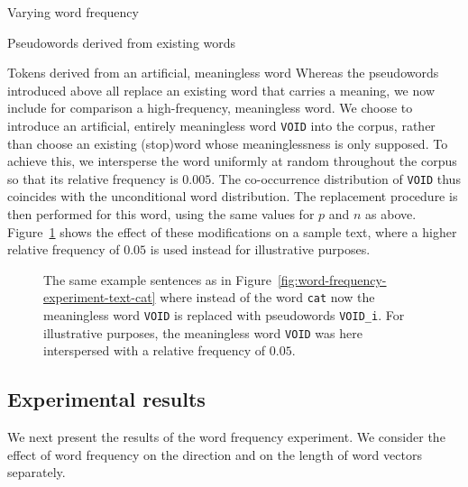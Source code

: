 \documentclass{article} %
\newcommand{\word}[1]{\texttt{#1}}
\begin{document}
\begin{section}{Varying word frequency}
\begin{subsection}{Pseudowords derived from existing words}
\end{subsection}

\begin{subsection}{Tokens derived from an artificial, meaningless word}
\label{WFVEmeaningless}
Whereas the pseudowords introduced above all replace an existing word that
carries a meaning, we now include for comparison a high-frequency,
meaningless word.  We choose to introduce an artificial, entirely
meaningless word \word{VOID} into the corpus, rather than choose an
existing (stop)word whose meaninglessness is only supposed.  To achieve
this, we intersperse the word uniformly at random throughout the corpus
so that its relative frequency is $0.005$.  The co-occurrence
distribution of \word{VOID} thus coincides with the unconditional word
distribution.  The replacement procedure is then performed for this
word, using the same values for $p$ and $n$ as above.
Figure~\ref{fig:word-frequency-experiment-text-void} shows the effect of
these modifications on a sample text, where a higher relative frequency
of $0.05$ is used instead for illustrative purposes.

\begin{figure}
	\begin{mdframed}
	
	\end{mdframed}
	\caption{The same example sentences as in
          Figure~\ref{fig:word-frequency-experiment-text-cat} where
          instead of the word \word{cat} now the meaningless word
          \word{VOID} is replaced with pseudowords \word{VOID\_i}.  For
          illustrative purposes, the meaningless word \word{VOID} was
          here interspersed with a relative frequency of
          $0.05$. }
	\label{fig:word-frequency-experiment-text-void}
\end{figure}
\end{subsection}



\subsection{Experimental results}\label{WFVE-results}
We next present the results of the word frequency experiment. We
consider the effect of word frequency on the direction and on the length
of word vectors separately.


\end{section}
\end{document}
